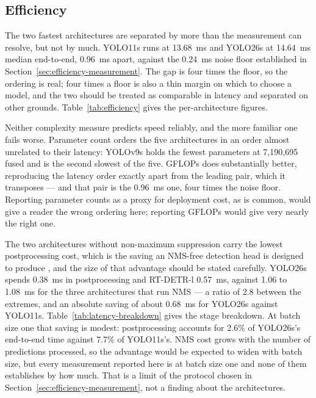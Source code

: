 \subsection{Efficiency}
\label{sec:efficiency}

The two fastest architectures are separated by more than the measurement can
resolve, but not by much. YOLO11s runs at 13.68~ms and YOLO26s at 14.64~ms
median end-to-end, 0.96~ms apart, against the 0.24~ms noise floor established in
Section~\ref{sec:efficiency-measurement}. The gap is four times the floor, so
the ordering is real; four times a floor is also a thin margin on which to
choose a model, and the two should be treated as comparable in latency and
separated on other grounds. Table~\ref{tab:efficiency} gives the per-architecture
figures.

Neither complexity measure predicts speed reliably, and the more familiar one
fails worse. Parameter count orders the five architectures in an order almost
unrelated to their latency: YOLOv9s holds the fewest parameters at 7{,}190{,}695
fused and is the second slowest of the five. GFLOPs does substantially better,
reproducing the latency order exactly apart from the leading pair, which it
transposes --- and that pair is the 0.96~ms one, four times the noise floor.
Reporting parameter counts as a proxy for deployment cost, as is common, would
give a reader the wrong ordering here; reporting GFLOPs would give very nearly
the right one.

The two architectures without non-maximum suppression carry the lowest
postprocessing cost, which is the saving an NMS-free detection head is designed
to produce \citep{yolov10}, and the size of that advantage should be stated
carefully.
YOLO26s spends 0.38~ms in postprocessing and RT-DETR-l 0.57~ms, against 1.06 to
1.08~ms for the three architectures that run NMS --- a ratio of 2.8 between the
extremes, and an absolute saving of about 0.68~ms for YOLO26s against YOLO11s.
Table~\ref{tab:latency-breakdown} gives the stage breakdown. At batch size one
that saving is modest: postprocessing accounts for 2.6\% of YOLO26s's end-to-end
time against 7.7\% of YOLO11s's. NMS cost grows with the number of predictions
processed, so the advantage would be expected to widen with batch size, but every
measurement reported here is at batch size one and none of them establishes by
how much. That is a limit of the protocol chosen in
Section~\ref{sec:efficiency-measurement}, not a finding about the architectures.




